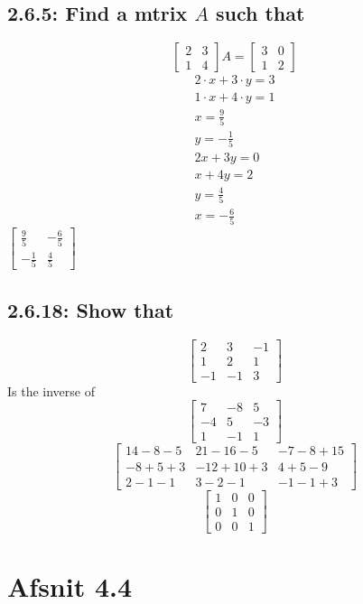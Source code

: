 \documentclass[12pt, a4paper]{report}
\begin{document}
			\subsection{2.6.5: Find a mtrix $A$ such that}
				$$\begin{bmatrix}2&3\\1&4\end{bmatrix}A=\begin{bmatrix}3&0\\1&2\end{bmatrix}$$
				\begin{align*}
					2\cdot x +3\cdot y =3\\
					1\cdot x +4\cdot y =1\\
					x=\frac{9}{5}\\
					y=-\frac{1}{5}\\
					2x+3y=0\\
					x+4y=2\\
					y=\frac{4}{5}\\
					x=-\frac{6}{5}
				\end{align*}
				$\begin{bmatrix}\frac{9}{5}&-\frac{6}{5}\\-\frac{1}{5}&\frac{4}{5}\end{bmatrix}$
			\setcounter{subsection}{17}
			\subsection{2.6.18: Show that}
				$$\begin{bmatrix}2&3&-1\\1&2&1\\-1&-1&3\end{bmatrix}$$
				Is the inverse of
				$$\begin{bmatrix}7&-8&5\\-4&5&-3\\1&-1&1\end{bmatrix}$$
				$$\begin{bmatrix}14-8-5&21-16-5&-7-8+15\\-8+5+3&-12+10+3&4+5-9\\2-1-1&3-2-1&-1-1+3\end{bmatrix}$$
				$$\begin{bmatrix}1&0&0\\0&1&0\\0&0&1\end{bmatrix}$$
		\setcounter{section}{1}
		\section{Afsnit 4.4}
			\setcounter{subsection}{25}
\end{document}
